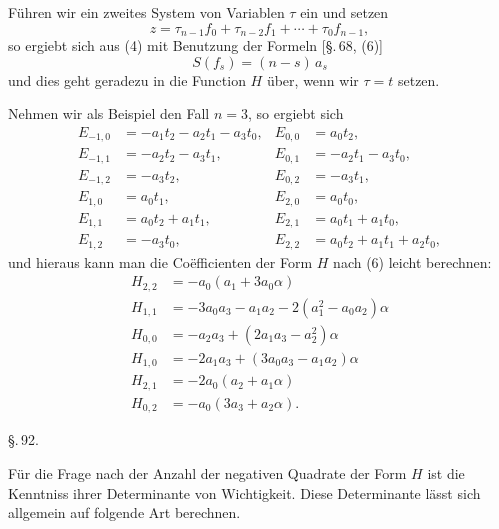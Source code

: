 
Führen wir ein zweites System von Variablen $\tau$ ein und setzen
\[
z = \tau_{n-1} f_0 + \tau_{n-2} f_1 + \cdots + \tau_0 f_{n-1},
\]
so ergiebt sich aus (4) mit Benutzung der Formeln [\S.\,68, (6)]
\[
S(f_s) = (n-s)\,a_s
\]
und dies geht geradezu in die Function $H$ über, wenn wir $\tau = t$ setzen.

Nehmen wir als Beispiel den Fall $n = 3$, so ergiebt sich
\[
\begin{aligned}
E_{-1,0} &= -a_1 t_2 - a_2 t_1 - a_3 t_0, & E_{0,0} &= a_0 t_2, \\
E_{-1,1} &= -a_2 t_2 - a_3 t_1, & E_{0,1} &= -a_2 t_1 - a_3 t_0, \\
E_{-1,2} &= -a_3 t_2, & E_{0,2} &= -a_3 t_1, \\
E_{1,0} &= a_0 t_1, & E_{2,0} &= a_0 t_0, \\
E_{1,1} &= a_0 t_2 + a_1 t_1, & E_{2,1} &= a_0 t_1 + a_1 t_0, \\
E_{1,2} &= -a_3 t_0, & E_{2,2} &= a_0 t_2 + a_1 t_1 + a_2 t_0,
\end{aligned}
\]
und hieraus kann man die Coëfficienten der Form $H$ nach (6) leicht berechnen:
\[
\begin{aligned}
H_{2,2} &= -a_0 (a_1 + 3 a_0 \alpha) \\
H_{1,1} &= -3 a_0 a_3 - a_1 a_2 - 2(a_1^2 - a_0 a_2)\alpha \\
H_{0,0} &= -a_2 a_3 + (2 a_1 a_3 - a_2^2)\alpha \\
H_{1,0} &= -2 a_1 a_3 + (3 a_0 a_3 - a_1 a_2)\alpha \\
H_{2,1} &= -2 a_0 (a_2 + a_1 \alpha) \\
H_{0,2} &= -a_0 (3 a_3 + a_2 \alpha).
\end{aligned}
\]

\begin{center}
\S.\,92.

\end{center}

Für die Frage nach der Anzahl der negativen Quadrate der Form $H$ ist die Kenntniss ihrer Determinante von Wichtigkeit. Diese Determinante lässt sich allgemein auf folgende Art berechnen.
